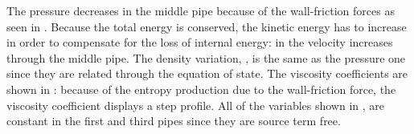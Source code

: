 %
The pressure decreases in the middle pipe because of the wall-friction forces as seen in . Because the total energy is conserved, the kinetic energy has to increase in order to compensate for the loss of internal energy: in  the velocity increases through the middle pipe. The density variation, , is the same as the pressure one since they are related through the equation of state. The viscosity coefficients are shown in : because of the entropy production due to the wall-friction force, the viscosity coefficient displays a step profile. All of the variables shown in , are constant in the first and third pipes since they are source term free.
